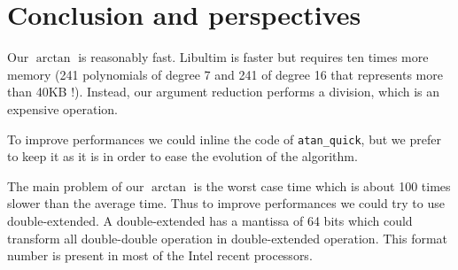\section{Conclusion and perspectives}

Our $\arctan$ is reasonably fast.  Libultim is faster but requires ten
times more memory (241 polynomials of degree 7 and 241 of degree 16
that represents more than 40KB !). Instead, our argument reduction
performs a division, which is an expensive operation.

To improve performances we could inline the code of \texttt{atan\_quick},
but we prefer to keep it as it is in order to ease the evolution of the
algorithm.

The main problem of our $\arctan$ is the worst case time which is about 100
times slower than the average time. Thus to improve performances we could
try to use double-extended. A double-extended has a mantissa of 64 bits
which could transform all double-double operation in double-extended
operation. This format number is present in most of the Intel recent
processors.
